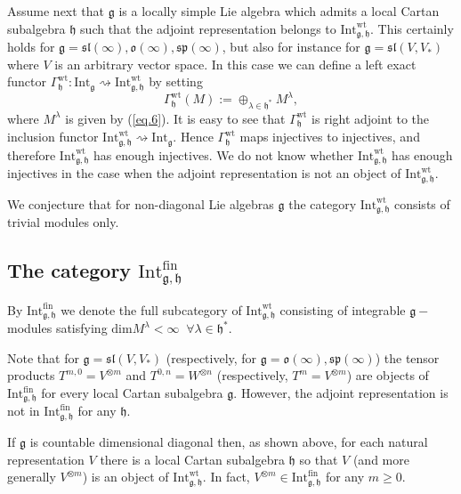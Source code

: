 \documentclass{svmult}
\newcommand{\wt}{\mathrm{wt}}
\renewcommand{\sp}{\mathfrak{sp}}
\renewcommand{\sl}{\mathfrak{sl}}
\newcommand{\oo}{\mathfrak{o}}
\newcommand{\hh}{\mathfrak{h}}
\renewcommand{\gg}{\mathfrak{g}}
\newcommand{\Int}{\mathrm{Int}}
\newcommand{\fin}{\mathrm{fin}}
\begin{document}
Assume next that $\gg$ is a locally simple Lie algebra which admits a
local Cartan subalgebra $\hh$ such that the adjoint representation
belongs to  $\Int^{\wt}_{\gg,\hh}$. This certainly holds for 
$\gg = \sl(\infty),\oo(\infty),\sp(\infty)$, but also for instance for 
$\gg = \sl(V,V_*)$ where $V$ is an arbitrary vector space. 
In this case we can define a left exact functor 
$\Gamma_\hh^\wt:\mathrm{Int}_{\gg}\rightsquigarrow\mathrm{Int}^{\wt}_{\gg,\hh}$ by setting
\begin{equation}\label{eq.7}
\Gamma_\hh^\wt(M):=\oplus_{\lambda\in\hh^*} M^{\lambda},\nonumber
\end{equation}
where $ M^{\lambda}$ is given by (\ref{eq.6}). It is easy to see that $\Gamma_\hh^\wt$ is right adjoint to the inclusion functor $\mathrm{Int}^{\wt}_{\gg,\hh}\rightsquigarrow\mathrm{Int}_{\gg}$. Hence $\Gamma_\hh^\wt$ maps injectives to injectives, and therefore $\mathrm{Int}^{\wt}_{\gg,\hh}$ has enough injectives. We do not know whether $\Int^{\wt}_{\gg,\hh}$ has enough injectives in the case when the adjoint representation is not an object of $\mathrm{Int}^{\wt}_{\gg,\hh}$.

We conjecture that for non-diagonal Lie algebras $\gg$ the category $\mathrm{Int}^{\wt}_{\gg,\hh}$ consists of trivial modules only. 

\subsection {The category  $\mathrm{Int}_{\gg,\hh}^\fin$}\label{sect:3.3}

By $\mathrm{Int}_{\gg,\hh}^\fin$ we denote the full subcategory of $\mathrm{Int}^{\wt}_{\gg,\hh}$ consisting of integrable $\gg-$modules satisfying 
$\mathrm{dim}M^{\lambda} < \infty \;\;\forall \lambda \in \hh^*$. 

Note that for $\gg = \sl(V,V_*)$ (respectively, for $\gg = \oo(\infty), \sp(\infty)$) the tensor products $T^{m,0} = V^{\otimes m}$ and $T^{0,n} = W^{\otimes n}$ (respectively, $T^m = V^{\otimes m}$) are objects of $\Int_{\gg,\hh}^\fin$ for every local Cartan subalgebra $\gg$. However, the adjoint representation is not in $\Int_{\gg,\hh}^\fin$ for any $\hh$.

If $\gg$ is countable dimensional diagonal then, as shown above, for each natural representation $V$ there is a local Cartan subalgebra $\hh$ so that $V$ (and more generally $V^{\otimes m}$) is an object of $\Int^{\wt}_{\gg,\hh}$. In fact, $V^{\otimes m} \in \Int_{\gg,\hh}^\fin$ for any $m \geq 0$. 
\end{document}
